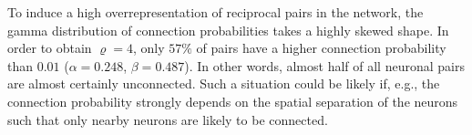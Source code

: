




To induce a high overrepresentation of reciprocal pairs in the
network, the gamma distribution of connection probabilities takes a
highly skewed shape. In order to obtain $\varrho = 4$, only $57\%$ of
pairs have a higher connection probability than $0.01$
($\alpha=0.248$, $\beta = 0.487$). In other words, almost half of all
neuronal pairs are almost certainly unconnected. Such a situation
could be likely if, e.g., the connection probability strongly depends
on the spatial separation of the neurons such that only nearby neurons
are likely to be connected.
